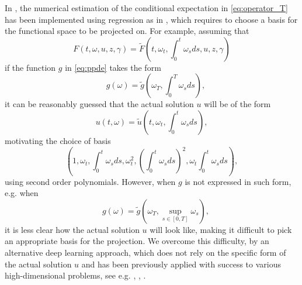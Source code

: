 \documentclass[12pt]{article}
\numberwithin{equation}{section}
\let\oldcitet=\citet
\renewcommand{\cite}[1]{\textcolor[rgb]{0,0,1}{\oldcitet{#1}}}
\renewcommand{\citet}[1]{\textcolor[rgb]{0,0,1}{\oldcitet{#1}}}
\begin{document}
\medskip

 In \cite{ren2017convergence},
the numerical estimation of the conditional expectation
in \eqref{eq:operator_T} has been implemented using regression
as in \cite{gobet2005regression},
which requires to choose a basis for the functional space
to be projected on.
 For example, assuming that
 $$
 F(t, \omega, u, z, \gamma) = \widetilde{F}
 \left(t, \omega_t, \int_0^t \omega_s ds, u, z, \gamma \right)
 $$
 if the function $g$ in \eqref{eq:ppde}
 takes the form
$$
 \quad g(\omega) = \widetilde{g}\left(\omega_T, \int_0^T \omega_s ds\right),
 $$
 it can be reasonably guessed that the actual solution $u$ will be of the form
 $$
 u(t, \omega) = \widetilde{u}\left(t, \omega_t, \int_0^t \omega_s ds\right),
 $$
motivating the choice of basis
$$
\left(1, \omega_t, \int_0^t \omega_s ds,
\omega^2_t, \left(\int_0^t \omega_s ds\right)^2, \omega_t\int_0^t \omega_s ds\right),
$$
 using second order polynomials.
 However, when $g$ is not expressed in such form, e.g.
 when
 $$
 \quad g(\omega) = \widetilde{g}\left(\omega_T, \sup_{s \in [0,T]} \omega_s\right),
 $$
it is less clear how the actual solution $u$ will look like,
making it difficult to pick an appropriate
basis for the projection.
We overcome this difficulty,
by an alternative deep learning approach,
which does not rely on the specific form of
the actual solution $u$ and
has been previously applied with success
to various high-dimensional problems,
see e.g. \cite{han2018solving}, \cite{beck2019deep}, \cite{hure2019some}.

\medskip
\end{document}
